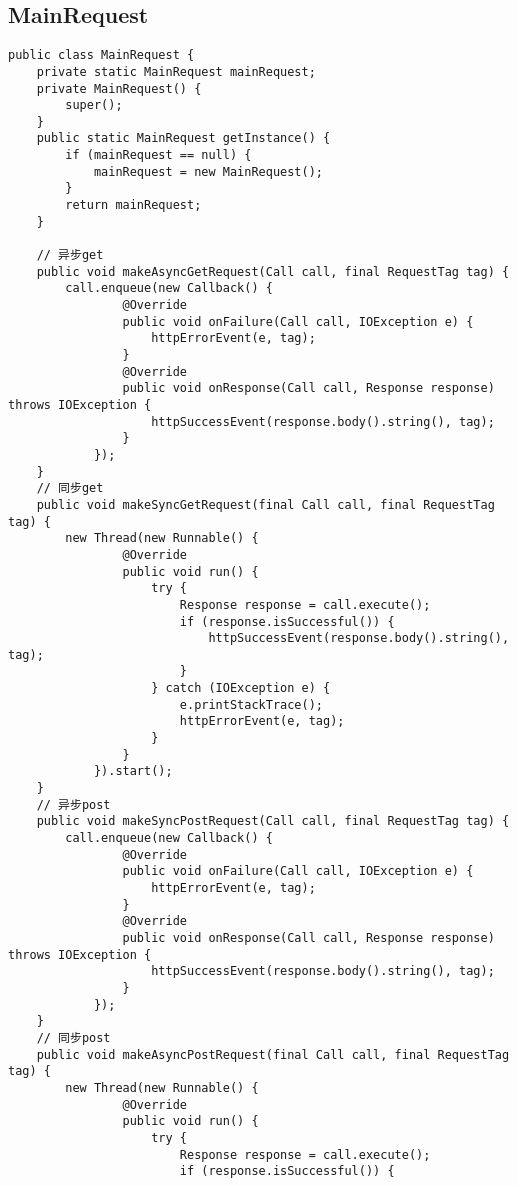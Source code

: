 \documentclass[9pt, b5paper]{article}
\begin{document}
\subsection{MainRequest}
\label{sec-4-7}
\begin{verbatim}
public class MainRequest {
    private static MainRequest mainRequest;
    private MainRequest() {
        super();
    }
    public static MainRequest getInstance() {
        if (mainRequest == null) {
            mainRequest = new MainRequest();
        }
        return mainRequest;
    }

    // 异步get
    public void makeAsyncGetRequest(Call call, final RequestTag tag) {
        call.enqueue(new Callback() {
                @Override
                public void onFailure(Call call, IOException e) {
                    httpErrorEvent(e, tag);
                }
                @Override
                public void onResponse(Call call, Response response) throws IOException {
                    httpSuccessEvent(response.body().string(), tag);
                }
            });
    }
    // 同步get
    public void makeSyncGetRequest(final Call call, final RequestTag tag) {
        new Thread(new Runnable() {
                @Override
                public void run() {
                    try {
                        Response response = call.execute();
                        if (response.isSuccessful()) {
                            httpSuccessEvent(response.body().string(), tag);
                        }
                    } catch (IOException e) {
                        e.printStackTrace();
                        httpErrorEvent(e, tag);
                    }
                }
            }).start();
    }
    // 异步post
    public void makeSyncPostRequest(Call call, final RequestTag tag) {
        call.enqueue(new Callback() {
                @Override
                public void onFailure(Call call, IOException e) {
                    httpErrorEvent(e, tag);
                }
                @Override
                public void onResponse(Call call, Response response) throws IOException {
                    httpSuccessEvent(response.body().string(), tag);
                }
            });
    }
    // 同步post
    public void makeAsyncPostRequest(final Call call, final RequestTag tag) {
        new Thread(new Runnable() {
                @Override
                public void run() {
                    try {
                        Response response = call.execute();
                        if (response.isSuccessful()) {

\end{verbatim}
\end{document}
